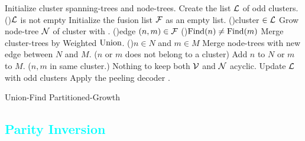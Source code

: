 \begin{algorithm}[h!]
  \BlankLine
  \BlankLine
  Initialize cluster spanning-trees and node-trees.\;\label{algo:B1a}%
  Create the list $\mathcal{L}$ of odd clusters.\;
  \While(){$\mathcal{L}$ is not empty}{
    Initialize the fusion list $\mathcal{F}$ as an empty list.\;\label{algo:B1b}
    \For(){cluster $\in\mathcal{L}$ \label{algo:B2a}}{
      Grow node-tree $\mathcal{N}$ of cluster with . \label{line:grow}
    }
    \For(){edge $(n,m) \in \mathcal{F}$\label{algo:B3a}}{
      \eIf(){$\operatorname{Find}(n)\neq\operatorname{Find}(m)$}{
        Merge cluster-trees by Weighted $\operatorname{Union}$.\;
        \eIf(){$n \in N$ and $m \in M$\label{algo:joina}}{
          Merge node-trees with new edge between $N$ and $M$.
        }($n$ or $m$ does not belong to a cluster){
          Add $n$ to $N$ or $m$ to $M$.\;\label{algo:joinb}
        }
      }($n,m$ in same cluster.\label{algo:dfa}){
        Nothing to keep both $\mathcal{V}$ and $\mathcal{N}$ acyclic.\;\label{algo:dfb} 
      }
    }
    Update $\mathcal{L}$ with odd clusters\; \label{algo:B3b}
  }
  Apply the peeling decoder \cite{delfosse2017linear}.\label{algo:B4a}
  \caption{Union-Find Partitioned-Growth}\label{algo:ufbb}
\end{algorithm}

\subsection{\textcolor{cyan}{Parity Inversion}}\label{sec:inversion}

